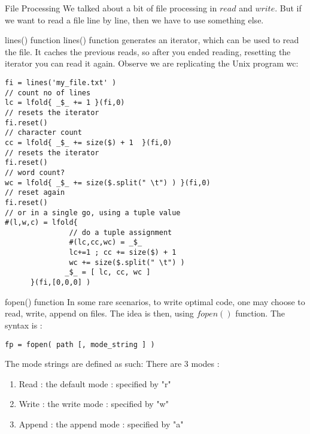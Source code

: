 \begin{section}{File Processing}
We talked about a bit of file processing in $read$ and $write$.
But if we want to read a file line by line, then we have to use something else.

\begin{subsection}{lines() function}
lines() function generates an iterator, which can be used to read the file.
It caches the previous reads, so after you ended reading, resetting the iterator 
you can read it again. Observe we are replicating the Unix program wc: 

\begin{center}\begin{minipage}{\linewidth}
\begin{lstlisting}[style=JexlStyle]
fi = lines('my_file.txt' )
// count no of lines 
lc = lfold{ _$_ += 1 }(fi,0)
// resets the iterator
fi.reset()
// character count 
cc = lfold{ _$_ += size($) + 1  }(fi,0)
// resets the iterator
fi.reset()
// word count?
wc = lfold{ _$_ += size($.split(" \t") ) }(fi,0)
// reset again 
fi.reset()
// or in a single go, using a tuple value 
#(l,w,c) = lfold{ 
               // do a tuple assignment 
               #(lc,cc,wc) = _$_ 
               lc+=1 ; cc += size($) + 1  
               wc += size($.split(" \t") )
              _$_ = [ lc, cc, wc ] 
      }(fi,[0,0,0] )
\end{lstlisting}
\end{minipage}\end{center}

\end{subsection}

\begin{subsection}{fopen() function}
In some rare scenarios, to write optimal code, 
one may choose to read, write, append on files.
The idea is then, using $fopen()$ function.
The syntax is :

\begin{lstlisting}[style=JexlStyle]
fp = fopen( path [, mode_string ] )
\end{lstlisting}

The mode strings are defined as such:
There are 3 modes :
\begin{enumerate}
\item{ Read : the default mode : specified by "r" }
\item{ Write : the write mode : specified by "w"  }
\item{ Append : the append mode : specified by "a" }
\end{enumerate}


\end{subsection}
\end{section}
